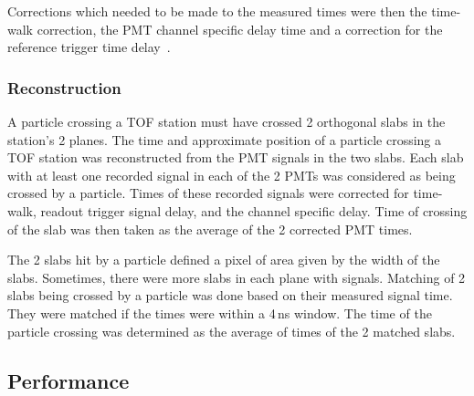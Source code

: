 Corrections which needed to be made to the measured times were then the
time-walk correction, the PMT channel specific delay time and
a correction for the reference trigger time delay~\cite{NOTE251}.

\subsubsection{Reconstruction}

A particle crossing a TOF station must have crossed 2 orthogonal slabs
in the station's 2 planes.  The time and approximate position of
a particle crossing a TOF station was reconstructed from the PMT signals
in the two slabs. Each slab with at least one recorded signal in each
of the 2 PMTs was considered as being crossed by a
particle. Times of these recorded signals were corrected for
time-walk, readout trigger signal delay, and the channel specific
delay. Time of crossing of the slab was then taken as the average of
the 2 corrected PMT times.

The 2 slabs hit by a particle defined a pixel of area given by the
width of the slabs. Sometimes, there were more slabs in each plane
with signals. Matching of 2 slabs being crossed by a particle was done
based on their measured signal time. They were matched if the times
were within a 4\,ns window. The time of the particle crossing was
determined as the average of times of the 2 matched slabs.


\subsection{Performance}
\label{SubSect:TOF_Performance}


